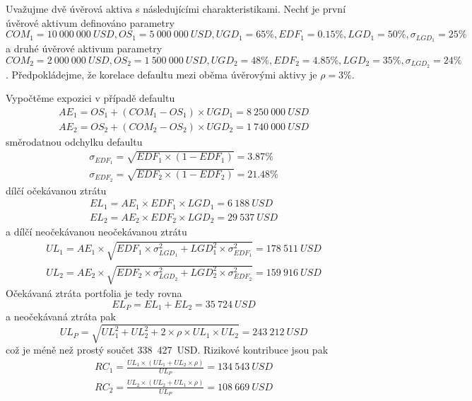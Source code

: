 \begin{example}
Uvažujme dvě úvěrová aktiva s následujícími charakteristikami. Nechť je první úvěrové aktivum definováno parametry $COM_1 = 10~000~000~USD, OS_1 = 5~000~000~USD, UGD_1 = 65\%, EDF_1 = 0.15\%, LGD_1 = 50\%, \sigma_{LGD_1} = 25\%$ a druhé úvěrové aktivum parametry $COM_2 = 2~000~000~USD, OS_2 = 1~500~000~USD, UGD_2 = 48\%, EDF_2 = 4.85\%, LGD_2 = 35\%, \sigma_{LGD_2} = 24\%$. Předpokládejme, že korelace defaultu mezi oběma úvěrovými aktivy je $\rho = 3\%$.

Vypočtěme expozici v případě defaultu
\begin{align*}
AE_1 = OS_1 + (COM_1 - OS_1) \times UGD_1 = 8~250~000~USD\\
AE_2 = OS_2 + (COM_2 - OS_2) \times UGD_2 = 1~740~000~USD
\end{align*}
směrodatnou odchylku defaultu
\begin{align*}
\sigma_{EDF_1} = \sqrt{EDF_1 \times (1 - EDF_1)} = 3.87\%\\
\sigma_{EDF_2} = \sqrt{EDF_2 \times (1 - EDF_2)} = 21.48\%
\end{align*}
dílčí očekávanou ztrátu
\begin{align*}
EL_1 = AE_1 \times EDF_1 \times LGD_1 = 6~188~USD\\
EL_2 = AE_2 \times EDF_2 \times LGD_2 = 29~537~USD
\end{align*}
a dílčí neočekávanou neočekávanou ztrátu
\begin{align*}
UL_1 = AE_1 \times \sqrt{EDF_1 \times \sigma_{LGD_1}^2 + LGD_1^2 \times \sigma_{EDF_1}^2} = 178~511~USD\\
UL_2 = AE_2 \times \sqrt{EDF_2 \times \sigma_{LGD_2}^2 + LGD_2^2 \times \sigma_{EDF_2}^2} = 159~916~USD
\end{align*}
Očekávaná ztráta portfolia je tedy rovna
\begin{equation*}
EL_P = EL_1 + EL_2 = 35~724~USD
\end{equation*}
a neočekávaná ztráta pak
\begin{equation*}
UL_P = \sqrt{UL_1^2 + UL_2^2 + 2 \times \rho \times UL_1 \times UL_2} = 243~212~USD
\end{equation*}
což je méně než prostý součet 338~427~USD. Rizikové kontribuce jsou pak
\begin{align*}
RC_1 = \frac{UL_1 \times (UL_1 + UL_2 \times \rho)}{UL_P} = 134~543~USD\\
RC_2 = \frac{UL_2 \times (UL_2 + UL_1 \times \rho)}{UL_P} = 108~669~USD
\end{align*}
\end{example}

